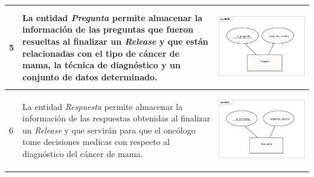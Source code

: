 \begin{table}[htb!]
	\footnotesize
	\begin{threeparttable}
		\begin{tabular}{p{0.5cm} p{7cm} p{7cm}} \toprule 
			5
			& La entidad \textit{Pregunta} permite almacenar la información de las preguntas que fueron resueltas al finalizar un \textit{Release} y que están relacionadas con el tipo de cáncer de mama, la técnica de diagnóstico y un conjunto de datos determinado. 
			& \begin{center}\includegraphics[width=1\linewidth]{MER/IMAGENES_MER/5_PREGUNTA}\end{center}
			\\ \hline
			6
			& La entidad \textit{Respuesta} permite almacenar la información de las respuestas obtenidas al finalizar un \textit{Release} y que servirán para que el oncólogo tome decisiones medicas con respecto al diagnóstico del cáncer de mama.
			& \begin{center}\includegraphics[width=1\linewidth]{MER/IMAGENES_MER/6_RESPUESTA}\end{center}

\end{tabular}
\end{threeparttable}
\end{table}

